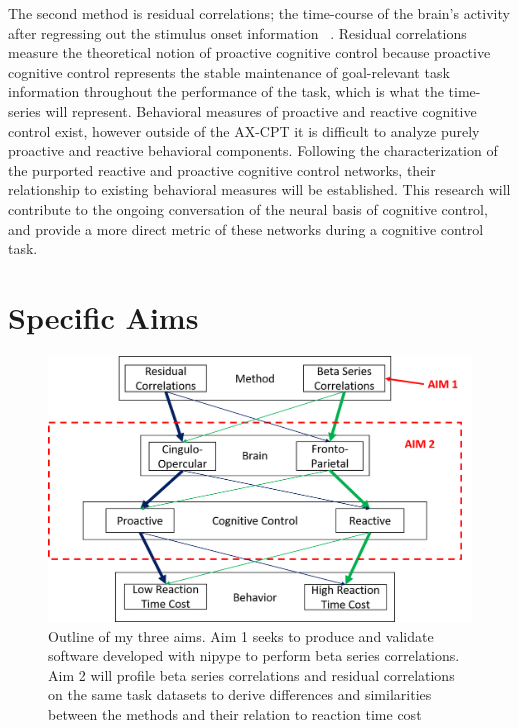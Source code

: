 \documentclass[phd,appendix,figures]{uithesis}
\begin{document}
The second method is residual correlations; the time-course of the brain's activity after regressing out the stimulus onset information ~\citep{Fair2007,Cole2014,Bolt2017}. 
Residual correlations measure the theoretical notion of proactive cognitive control because proactive cognitive control represents the stable maintenance of goal-relevant task information throughout the performance of the task, which is what the time-series will represent.
Behavioral measures of proactive and reactive cognitive control exist, however outside of the AX-CPT it is difficult to analyze purely proactive and reactive behavioral components. 
Following the characterization of the purported reactive and proactive cognitive control networks, their relationship to existing behavioral measures will be established.
This research will contribute to the ongoing conversation of the neural basis of cognitive control, and provide a more direct metric of these networks during a  cognitive control task.

\section{Specific Aims}
\begin{figure}[H]%
	\centering
	\includegraphics[width=1\linewidth]{overall_thesis_pic}
	\caption{Outline of my three aims. Aim 1 seeks to produce and validate software developed with nipype to perform beta series correlations. Aim 2 will profile beta series correlations and residual correlations on the same task datasets to derive differences and similarities between the methods and their relation to reaction time cost}
	\label{fig:all_aims}
\end{figure}
\end{document}
